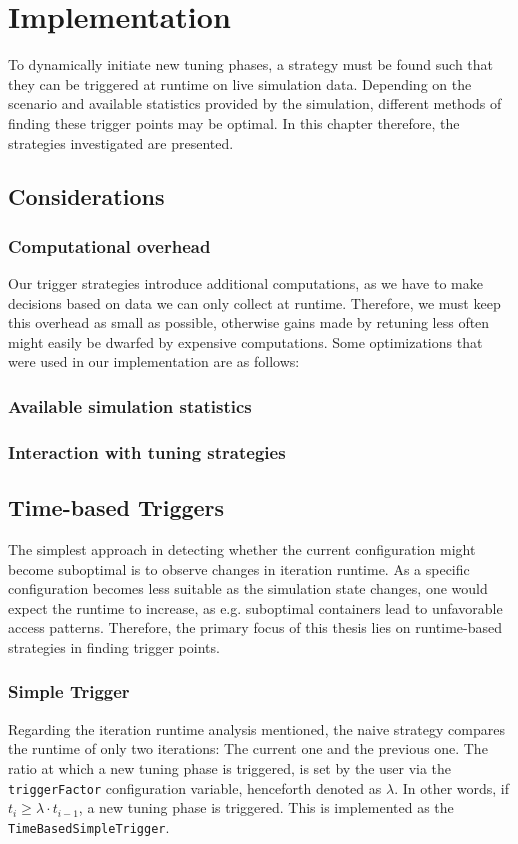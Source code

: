 \chapter[Implementation]{Implementation}
\label{cp:implementation}

{
\parindent0pt
To dynamically initiate new tuning phases, a strategy must be found such that they can be triggered at runtime on live simulation data. Depending on the scenario and available statistics provided by the simulation, different methods of finding these trigger points may be optimal. In this chapter therefore, the strategies investigated are presented.
}

\section{Considerations}
\subsection{Computational overhead}
Our trigger strategies introduce additional computations, as we have to make decisions based on data we can only collect at runtime. Therefore, we must keep this overhead as small as possible, otherwise gains made by retuning less often might easily be dwarfed by expensive computations.
Some optimizations that were used in our implementation are as follows: \textellipsis
\subsection{Available simulation statistics}
\subsection{Interaction with tuning strategies}

\section{Time-based Triggers}

The simplest approach in detecting whether the current configuration might become suboptimal is to observe changes in iteration runtime. As a specific configuration becomes less suitable as the simulation state changes, one would expect the runtime to increase, as e.g. suboptimal containers lead to unfavorable access patterns. Therefore, the primary focus of this thesis lies on runtime-based strategies in finding trigger points.

\subsection{Simple Trigger}
\label{subsec:simple_trigger}
Regarding the iteration runtime analysis mentioned, the naive strategy compares the runtime of only two iterations: The current one and the previous one. The ratio at which a new tuning phase is triggered, is set by the user via the \texttt{triggerFactor} configuration variable, henceforth denoted as $\lambda$. In other words, if $t_i \ge \lambda\cdot t_{i-1}$, a new tuning phase is triggered. This is implemented as the \texttt{TimeBasedSimpleTrigger}.


